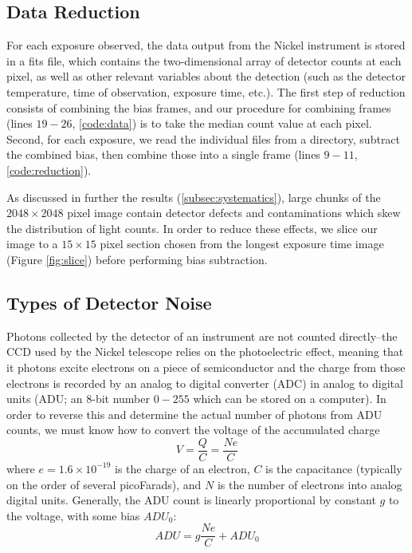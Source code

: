 \documentclass[preprint]{aastex62}
\begin{document}
\subsection{Data Reduction} \label{sec:reduction}
For each exposure observed, the data output from the Nickel instrument is stored in a fits file, which contains the two-dimensional array of detector counts at each pixel, as well as other relevant variables about the detection (such as the detector temperature, time of observation, exposure time, etc.). The first step of reduction consists of combining the bias frames, and our procedure for combining frames (lines $19-26$, \ref{code:data}) is to take the median count value at each pixel. Second, for each exposure, we read the individual files from a directory, subtract the combined bias, then combine those into a single frame (lines $9-11$, \ref{code:reduction}).

As discussed in further the results (\ref{subsec:systematics}), large chunks of the $2048\times2048$ pixel image contain detector defects and contaminations which skew the distribution of light counts. In order to reduce these effects, we slice our image to a $15\times15$ pixel section chosen from the longest exposure time image (Figure \ref{fig:slice}) before performing bias subtraction.

\subsection{Types of Detector Noise} \label{subsec:noise}
Photons collected by the detector of an instrument are not counted directly--the CCD used by the Nickel telescope relies on the photoelectric effect, meaning that it photons excite electrons on a piece of semiconductor and the charge from those electrons is recorded by an analog to digital converter (ADC) in analog to digital units (ADU; an 8-bit number $0-255$ which can be stored on a computer). In order to reverse this and determine the actual number of photons from ADU counts, we must know how to convert the voltage of the accumulated charge 
\begin{equation}
V = \frac{Q}{C} = \frac{Ne}{C}
\end{equation}
where $e=1.6\times10^{-19}$ is the charge of an electron, $C$ is the capacitance (typically on the order of several picoFarads), and $N$ is the number of electrons into analog digital units. Generally, the ADU count is linearly proportional by constant $g$ to the voltage, with some bias $ADU_0$:
\begin{equation}
ADU = g\frac{Ne}{C} + ADU_0
\end{equation}
\end{document}
